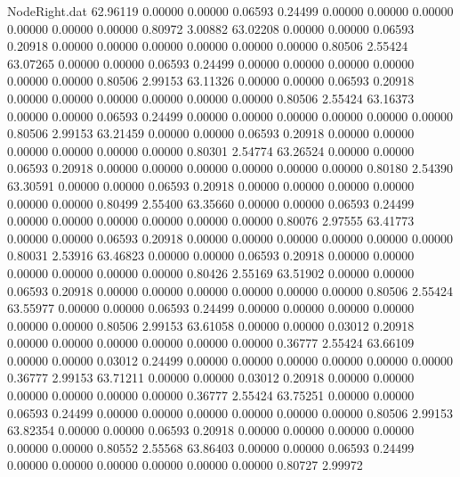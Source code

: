 \begin{filecontents}{NodeRight.dat}
  62.96119    0.00000    0.00000     0.06593    0.24499    0.00000    0.00000    0.00000    0.00000    0.00000    0.00000    0.80972    3.00882
  63.02208    0.00000    0.00000     0.06593    0.20918    0.00000    0.00000    0.00000    0.00000    0.00000    0.00000    0.80506    2.55424
  63.07265    0.00000    0.00000     0.06593    0.24499    0.00000    0.00000    0.00000    0.00000    0.00000    0.00000    0.80506    2.99153
  63.11326    0.00000    0.00000     0.06593    0.20918    0.00000    0.00000    0.00000    0.00000    0.00000    0.00000    0.80506    2.55424
  63.16373    0.00000    0.00000     0.06593    0.24499    0.00000    0.00000    0.00000    0.00000    0.00000    0.00000    0.80506    2.99153
  63.21459    0.00000    0.00000     0.06593    0.20918    0.00000    0.00000    0.00000    0.00000    0.00000    0.00000    0.80301    2.54774
  63.26524    0.00000    0.00000     0.06593    0.20918    0.00000    0.00000    0.00000    0.00000    0.00000    0.00000    0.80180    2.54390
  63.30591    0.00000    0.00000     0.06593    0.20918    0.00000    0.00000    0.00000    0.00000    0.00000    0.00000    0.80499    2.55400
  63.35660    0.00000    0.00000     0.06593    0.24499    0.00000    0.00000    0.00000    0.00000    0.00000    0.00000    0.80076    2.97555
  63.41773    0.00000    0.00000     0.06593    0.20918    0.00000    0.00000    0.00000    0.00000    0.00000    0.00000    0.80031    2.53916
  63.46823    0.00000    0.00000     0.06593    0.20918    0.00000    0.00000    0.00000    0.00000    0.00000    0.00000    0.80426    2.55169
  63.51902    0.00000    0.00000     0.06593    0.20918    0.00000    0.00000    0.00000    0.00000    0.00000    0.00000    0.80506    2.55424
  63.55977    0.00000    0.00000     0.06593    0.24499    0.00000    0.00000    0.00000    0.00000    0.00000    0.00000    0.80506    2.99153
  63.61058    0.00000    0.00000     0.03012    0.20918    0.00000    0.00000    0.00000    0.00000    0.00000    0.00000    0.36777    2.55424
  63.66109    0.00000    0.00000     0.03012    0.24499    0.00000    0.00000    0.00000    0.00000    0.00000    0.00000    0.36777    2.99153
  63.71211    0.00000    0.00000     0.03012    0.20918    0.00000    0.00000    0.00000    0.00000    0.00000    0.00000    0.36777    2.55424
  63.75251    0.00000    0.00000     0.06593    0.24499    0.00000    0.00000    0.00000    0.00000    0.00000    0.00000    0.80506    2.99153
  63.82354    0.00000    0.00000     0.06593    0.20918    0.00000    0.00000    0.00000    0.00000    0.00000    0.00000    0.80552    2.55568
  63.86403    0.00000    0.00000     0.06593    0.24499    0.00000    0.00000    0.00000    0.00000    0.00000    0.00000    0.80727    2.99972

\end{filecontents}
